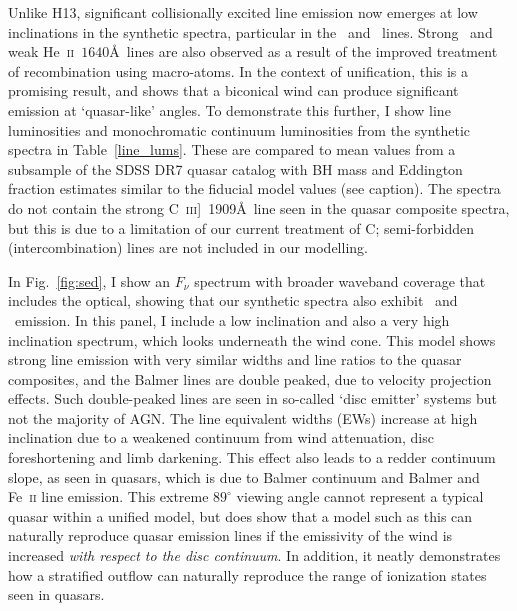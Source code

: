 Unlike H13, significant collisionally excited line emission now emerges
at low inclinations in the synthetic spectra, particular in the \civ\ and \nv\
lines. Strong \la\ and
weak He~\textsc{ii}~$1640$\AA\ lines are also observed
as a result of the improved treatment of recombination using macro-atoms. 
In the context of unification, this is a promising result, 
and shows that a biconical wind can produce significant 
emission at `quasar-like' angles. To demonstrate this further,
I show line luminosities and monochromatic continuum luminosities
from the synthetic spectra in Table~\ref{line_lums}. These are compared to
mean values from a subsample of the SDSS DR7 quasar catalog \citep{shen2011} 
with BH mass and Eddington fraction estimates similar to the fiducial model values 
(see caption). The spectra do not contain the strong 
C~\textsc{iii}]~1909\AA\ line seen in the quasar composite spectra, 
but this is due to a limitation of our current treatment of C; semi-forbidden
(intercombination) lines are not included in our modelling.

In Fig.~\ref{fig:sed}, I show an $F_{\nu}$ spectrum with broader waveband coverage
that includes the optical, showing that our synthetic spectra 
also exhibit \ha\ and \hb\ emission. 
In this panel, I include a low inclination and 
also a very high inclination 
spectrum, which looks underneath the wind cone. This model shows 
strong line emission with very similar widths and line ratios to the quasar composites, and
the Balmer lines are double peaked, due to velocity projection effects.  
Such double-peaked lines are seen in so-called `disc emitter' systems 
\citep[e.g.][]{eracleous1994} but not the majority of AGN.     
The line equivalent widths (EWs) increase at high inclination
due to a weakened continuum from wind attenuation, 
disc foreshortening and limb darkening. This effect also 
leads to a redder continuum slope, as seen in quasars, which is
due to Balmer continuum and Balmer and Fe~\textsc{ii} line emission.
This extreme $89^\circ$ viewing angle cannot represent a typical quasar within a unified model,
but does show that a model such as this can naturally reproduce quasar emission lines
if the emissivity of the wind is increased {\em with respect to the disc continuum}.
In addition, it neatly demonstrates how a stratified outflow can naturally
reproduce the range of ionization states seen in quasars. 

